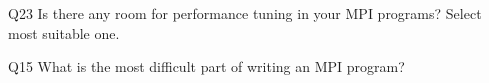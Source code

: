 \begin{description}%
\item{Q23} Is there any room for performance tuning in your MPI programs? Select most suitable one.%
\item{Q15} What is the most difficult part of writing an MPI program?%
\end{description}%
